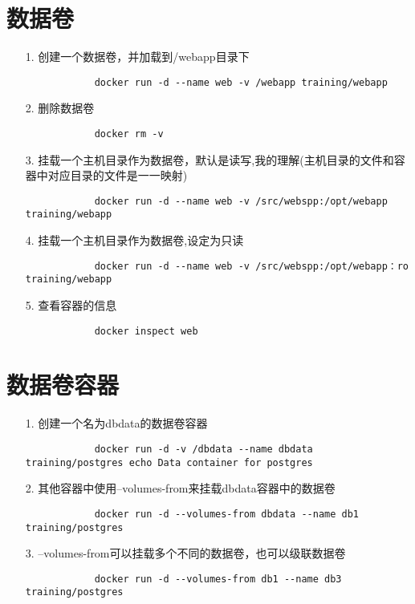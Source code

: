 \documentclass[a4paper,left=1.5cm,right=1.5cm,11pt]{article}
\begin{document}
\tableofcontents

\clearpage

\section{数据卷}
\begin{itemize}
	\item[1.]创建一个数据卷，并加载到/webapp目录下
		\begin{lstlisting}
			docker run -d --name web -v /webapp training/webapp
		\end{lstlisting}
	\item[2.]删除数据卷
		\begin{lstlisting}
			docker rm -v 
		\end{lstlisting}
	\item[3.]挂载一个主机目录作为数据卷，默认是读写,我的理解(主机目录的文件和容器中对应目录的文件是一一映射)
		\begin{lstlisting}
			docker run -d --name web -v /src/webspp:/opt/webapp training/webapp
		\end{lstlisting}
	\item[4.]挂载一个主机目录作为数据卷,设定为只读
		\begin{lstlisting}
			docker run -d --name web -v /src/webspp:/opt/webapp：ro training/webapp
		\end{lstlisting}
	\item[5.]查看容器的信息
		\begin{lstlisting}
			docker inspect web
		\end{lstlisting}
\end{itemize}
\section{数据卷容器}
\begin{itemize}
	\item[1.]创建一个名为dbdata的数据卷容器
		\begin{lstlisting}
			docker run -d -v /dbdata --name dbdata training/postgres echo Data container for postgres
		\end{lstlisting}
	\item[2.]其他容器中使用--volumes-from来挂载dbdata容器中的数据卷
		\begin{lstlisting}
			docker run -d --volumes-from dbdata --name db1 training/postgres
		\end{lstlisting}
	\item[3.]--volumes-from可以挂载多个不同的数据卷，也可以级联数据卷
		\begin{lstlisting}
			docker run -d --volumes-from db1 --name db3 training/postgres
		\end{lstlisting}
\end{itemize}
\end{document}
